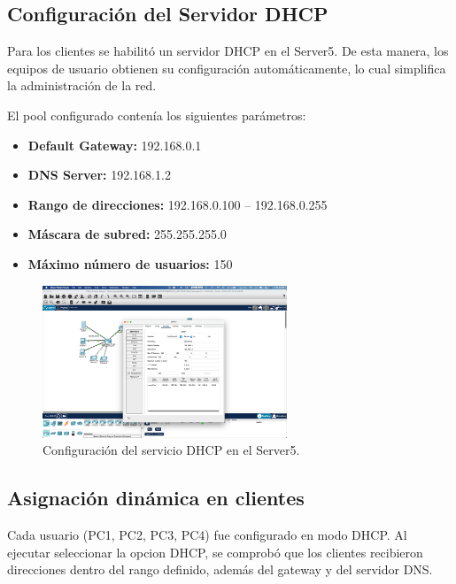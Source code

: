 \documentclass[10pt]{article}
\begin{document}
\subsection{Configuración del Servidor DHCP}

Para los clientes se habilitó un servidor DHCP en el Server5. De esta manera, los equipos de usuario obtienen su configuración automáticamente, lo cual simplifica la administración de la red.

El pool configurado contenía los siguientes parámetros:

\begin{itemize}
    \item \textbf{Default Gateway:} 192.168.0.1
    \item \textbf{DNS Server:} 192.168.1.2
    \item \textbf{Rango de direcciones:} 192.168.0.100 -- 192.168.0.255
    \item \textbf{Máscara de subred:} 255.255.255.0
    \item \textbf{Máximo número de usuarios:} 150
\end{itemize}

\begin{figure}[H]
    \centering
    \includegraphics[width=0.65\textwidth]{lab-01-screenshots/41-5-DHCP-config.png}
    \caption{Configuración del servicio DHCP en el Server5.}
\end{figure}

\subsection{Asignación dinámica en clientes}

Cada usuario (PC1, PC2, PC3, PC4) fue configurado en modo DHCP. Al ejecutar seleccionar la opcion DHCP, se comprobó que los clientes recibieron direcciones dentro del rango definido, además del gateway y del servidor DNS.
\end{document}
